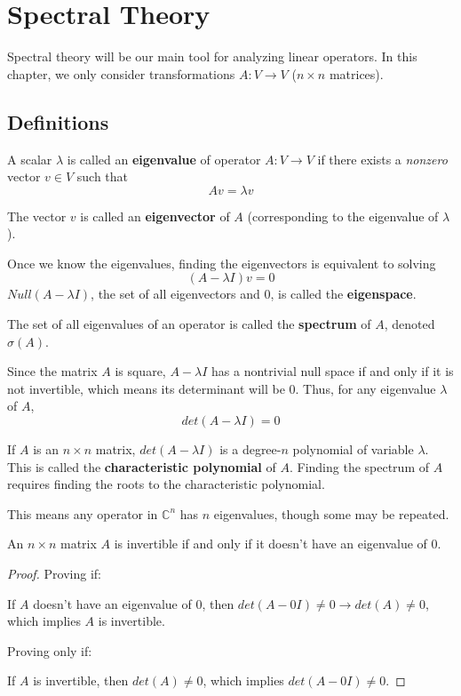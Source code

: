 \chapter{Spectral Theory}
Spectral theory will be our main tool for analyzing linear operators. In this chapter, we only consider transformations $A: V \rightarrow V$ ($n \times n$ matrices). 

\section{Definitions}

\begin{definition}
A scalar $\lambda$ is called an \textbf{eigenvalue} of operator $A: V \rightarrow V$ if there exists a \textit{nonzero} vector $v \in V$ such that 
$$Av = \lambda v$$

The vector $v$ is called an \textbf{eigenvector} of $A$ (corresponding to the eigenvalue of $\lambda$).

Once we know the eigenvalues, finding the eigenvectors is equivalent to solving 
$$(A - \lambda I)v = 0$$
$Null(A - \lambda I)$, the set of all eigenvectors and 0, is called the \textbf{eigenspace}. 

The set of all eigenvalues of an operator is called the \textbf{spectrum} of $A$, denoted $\sigma (A)$. 
\end{definition}

Since the matrix $A$ is square, $A - \lambda I$ has a nontrivial null space if and only if it is not invertible, which means its determinant will be 0. Thus, for any eigenvalue $\lambda$ of $A$, 
$$det(A - \lambda I) = 0$$

\begin{definition}
If $A$ is an $n \times n$ matrix, $det(A - \lambda I)$ is a degree-$n$ polynomial of variable $\lambda$. This is called the \textbf{characteristic polynomial} of $A$. Finding the spectrum of $A$ requires finding the roots to the characteristic polynomial. 

This means any operator in $\mathbb{C}^{n}$ has $n$ eigenvalues, though some may be repeated. 
\end{definition}

\begin{theorem}
An $n \times n$ matrix $A$ is invertible if and only if it doesn't have an eigenvalue of 0. 
\end{theorem}

\begin{proof}
Proving if: 

If $A$ doesn't have an eigenvalue of 0, then $det(A - 0I) \neq 0 \rightarrow det(A) \neq 0$, which implies $A$ is invertible. 

Proving only if: 

If $A$ is invertible, then $det(A) \neq 0$, which implies $det(A - 0I) \neq 0$. 
\end{proof}

